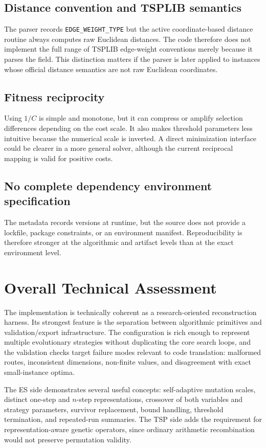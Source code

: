 \documentclass[11pt,a4paper]{article}
\newcommand{\code}[1]{\texttt{#1}}
\begin{document}
\subsection{Distance convention and TSPLIB semantics}
The parser records \code{EDGE\_WEIGHT\_TYPE} but the active coordinate-based distance routine always computes raw Euclidean distances. The code therefore does not implement the full range of TSPLIB edge-weight conventions merely because it parses the field. This distinction matters if the parser is later applied to instances whose official distance semantics are not raw Euclidean coordinates.

\subsection{Fitness reciprocity}
Using $1/C$ is simple and monotone, but it can compress or amplify selection differences depending on the cost scale. It also makes threshold parameters less intuitive because the numerical scale is inverted. A direct minimization interface could be clearer in a more general solver, although the current reciprocal mapping is valid for positive costs.

\subsection{No complete dependency environment specification}
The metadata records versions at runtime, but the source does not provide a lockfile, package constraints, or an environment manifest. Reproducibility is therefore stronger at the algorithmic and artifact levels than at the exact environment level.

\section{Overall Technical Assessment}
The implementation is technically coherent as a research-oriented reconstruction harness. Its strongest feature is the separation between algorithmic primitives and validation/export infrastructure. The configuration is rich enough to represent multiple evolutionary strategies without duplicating the core search loops, and the validation checks target failure modes relevant to code translation: malformed routes, inconsistent dimensions, non-finite values, and disagreement with exact small-instance optima.

The ES side demonstrates several useful concepts: self-adaptive mutation scales, distinct one-step and $n$-step representations, crossover of both variables and strategy parameters, survivor replacement, bound handling, threshold termination, and repeated-run summaries. The TSP side adds the requirement for representation-aware genetic operators, since ordinary arithmetic recombination would not preserve permutation validity.
\end{document}
